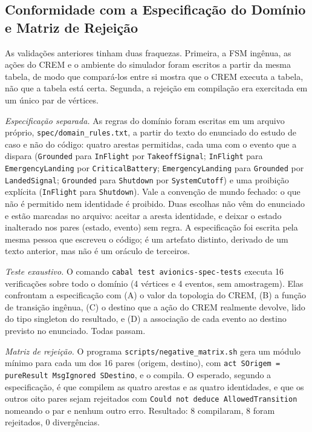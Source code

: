 \documentclass[12pt,a4paper]{article}
\begin{document}
\subsection{Conformidade com a Especificação do Domínio e Matriz de Rejeição}

As validações anteriores tinham duas fraquezas. Primeira, a FSM ingênua, as ações do CREM e o ambiente do simulador foram escritos a partir da mesma tabela, de modo que compará-los entre si mostra que o CREM executa a tabela, não que a tabela está certa. Segunda, a rejeição em compilação era exercitada em um único par de vértices.

\textit{Especificação separada.} As regras do domínio foram escritas em um arquivo próprio, \texttt{spec/domain\_rules.txt}, a partir do texto do enunciado do estudo de caso e não do código: quatro arestas permitidas, cada uma com o evento que a dispara (\texttt{Grounded} para \texttt{InFlight} por \texttt{TakeoffSignal}; \texttt{InFlight} para \texttt{EmergencyLanding} por \texttt{CriticalBattery}; \texttt{EmergencyLanding} para \texttt{Grounded} por \texttt{LandedSignal}; \texttt{Grounded} para \texttt{Shutdown} por \texttt{SystemCutoff}) e uma proibição explícita (\texttt{InFlight} para \texttt{Shutdown}). Vale a convenção de mundo fechado: o que não é permitido nem identidade é proibido. Duas escolhas não vêm do enunciado e estão marcadas no arquivo: aceitar a aresta identidade, e deixar o estado inalterado nos pares (estado, evento) sem regra. A especificação foi escrita pela mesma pessoa que escreveu o código; é um artefato distinto, derivado de um texto anterior, mas não é um oráculo de terceiros.

\textit{Teste exaustivo.} O comando \texttt{cabal test avionics-spec-tests} executa 16 verificações sobre todo o domínio (4 vértices e 4 eventos, sem amostragem). Elas confrontam a especificação com (A) o valor da topologia do CREM, (B) a função de transição ingênua, (C) o destino que a ação do CREM realmente devolve, lido do tipo singleton do resultado, e (D) a associação de cada evento ao destino previsto no enunciado. Todas passam.

\textit{Matriz de rejeição.} O programa \texttt{scripts/negative\_matrix.sh} gera um módulo mínimo para cada um dos 16 pares (origem, destino), com \texttt{act SOrigem = pureResult MsgIgnored SDestino}, e o compila. O esperado, segundo a especificação, é que compilem as quatro arestas e as quatro identidades, e que os outros oito pares sejam rejeitados com \texttt{Could not deduce AllowedTransition} nomeando o par e nenhum outro erro. Resultado: 8 compilaram, 8 foram rejeitados, 0 divergências.
\end{document}
